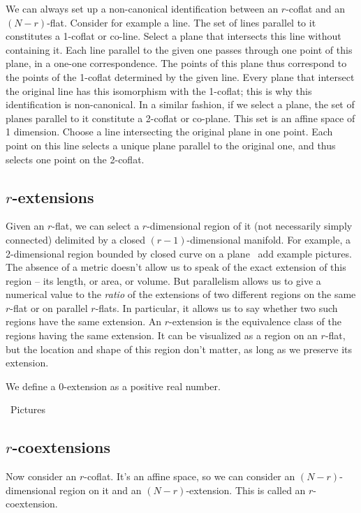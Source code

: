 \documentclass[\ifafour a4paper,12pt,\else a5paper,10pt,\fi%
onecolumn,oneside,article,%
british%
]{memoir}
\theoremstyle{remark}
\theoremstyle{innote}
\renewcommand*{\|}{\nonscript\,\vert\nonscript\;\mathopen{}}
\newcommand*{\puzzle}{{\fontencoding{U}\fontfamily{fontawesometwo}\selectfont\symbol{225}}}
\newcommand{\mynote}[1]{ {\color{notecolour}\puzzle\ #1}}
\newcommand*{\yr}{r}
\newcommand*{\yN}{N}
\begin{document}
We can always set up a non-canonical identification between an $\yr$-coflat
and an $(\yN-\yr)$-flat. Consider for example a line. The set of lines
parallel to it constitutes a 1-coflat or co-line. Select a plane that
intersects this line without containing it. Each line parallel to the given
one passes through one point of this plane, in a one-one correspondence.
The points of this plane thus correspond to the points of the 1-coflat
determined by the given line. Every plane that intersect the original line
has this isomorphism with the 1-coflat; this is why this identification is
non-canonical. In a similar fashion, if we select a plane, the set of
planes parallel to it constitute a 2-coflat or co-plane. This set is an
affine space of 1 dimension. Choose a line intersecting the original plane
in one point. Each point on this line selects a unique plane parallel to
the original one, and thus selects one point on the 2-coflat.


\subsection{$\yr$-extensions}
\label{sec:extensions}

Given an $\yr$-flat, we can select a $\yr$-dimensional region of it (not
necessarily simply connected) delimited by a closed $(\yr-1)$-dimensional
manifold. For example, a 2-dimensional region bounded by closed curve on a
plane \mynote{add example pictures}. The absence of a metric doesn't allow
us to speak of the exact extension of this region -- its length, or area,
or volume. But parallelism allows us to give a numerical value to the
\emph{ratio} of the extensions of two different regions on the same
$\yr$-flat or on parallel $\yr$-flats. In particular, it allows us to say
whether two such regions have the same extension. An $\yr$-extension is the
equivalence class of the regions having the same extension. It can be
visualized as a region on an $\yr$-flat, but the location and shape of this
region don't matter, as long as we preserve its extension.

We define a 0-extension as a positive real number.

\mynote{Pictures}

\subsection{$\yr$-coextensions}
\label{sec:coextensions}


Now consider an $\yr$-coflat. It's an affine space, so we can consider an
$(\yN-\yr)$-dimensional region on it and an $(\yN-\yr)$-extension. This is
called an $\yr$-coextension.
\end{document}
